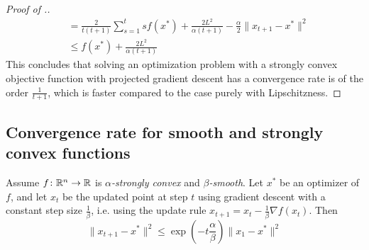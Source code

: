 \begin{proof}[Proof of .]
\begin{align*}
                                                           &= \frac{2}{t(t+1)}\sum_{s=1}^{t}sf(x^{*}) + \frac{2L^{2}}{\alpha(t+1)} - \frac{\alpha}{2}\|x_{t+1} - x^{*}\|^{2} \tag{by telescoping sum}\\
                                                           &\leq f(x^{*}) + \frac{2L^{2}}{\alpha(t+1)}
\end{align*}
This concludes that solving an optimization problem with a strongly convex objective function with projected gradient descent has a convergence rate is of the order $\frac{1}{t+1}$, which is faster compared to the case purely with Lipschitzness.
\end{proof}

\subsection{Convergence rate for smooth and strongly convex functions}

\begin{theorem} Assume $f\colon\mathbb{R}^n\to\mathbb{R}$ is \emph{$\alpha$-strongly convex} and \emph{$\beta$-smooth}. Let $x^{*}$ be an optimizer of $f$, and let $x_{t}$ be the updated point at step $t$ using gradient descent with a constant step size $\frac{1}{\beta}$, i.e. using the update rule $x_{t+1} = x_t - \frac{1}{\beta}\nabla f(x_t)$. Then
\[
\|x_{t+1} - x^*\|^2 \leq \exp{(-t \frac{\alpha}{\beta})}\|x_1 - x^*\|^2
\]
\end{theorem}

